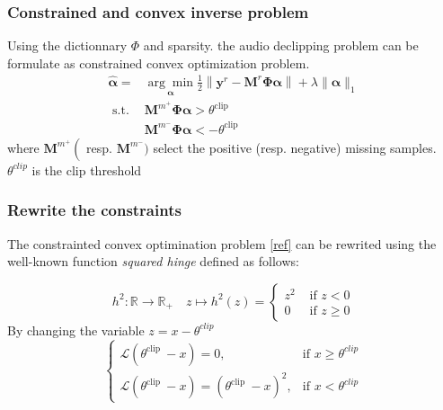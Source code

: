 \documentclass{article}
\numberwithin{dummy}{section}
\begin{document}
\subsubsection{Constrained and convex inverse problem}
Using the dictionnary $\Phi$ and sparsity.
the audio declipping problem can be formulate as constrained convex optimization problem.
\begin{equation}
\begin{aligned}
\hat{\boldsymbol{\alpha}}=& \underset{\boldsymbol{\alpha}}{\arg \min } \frac{1}{2}\left\|\mathbf{y}^{r}-\mathbf{M}^{r} \mathbf{\Phi} \boldsymbol{\alpha}\right\|+\lambda\|\boldsymbol{\alpha}\|_{1} \\
\text { s.t. } & \mathbf{M}^{m^{+}} \mathbf{\Phi} \boldsymbol{\alpha}>\theta^{\text {clip }} \\
& \mathbf{M}^{m^{-}} \mathbf{\Phi} \boldsymbol{\alpha}<-\theta^{\text {clip}}
\end{aligned}
\label{ref}
\end{equation}
where
$\mathbf{M}^{m^{+}}\left(\right.$ resp. $\left.\mathbf{M}^{m^{-}}\right.)$ select the positive (resp. negative) missing samples.\\
$\theta^{clip}$ is the clip threshold
\subsubsection{Rewrite the constraints}
The constrainted convex optimination problem \ref{ref} can be rewrited using the well-known function \textit{squared hinge} defined as follows:

$$
h^{2}: \mathbb{R} \longrightarrow \mathbb{R}_{+} \quad z \mapsto h^{2}(z)=\left\{\begin{array}{ll}
z^{2} & \text { if } z<0 \\
0 & \text { if } z \geq 0
\end{array}\right.
$$
By changing the variable $z=x-\theta^{clip}$\\
\[
\begin{cases}
\mathcal{L}\left(\theta^{\text {clip }}-x\right)=0, & \text{if $x\geq \theta^{c l i p}$} \\
\mathcal{L}\left(\theta^{\text {clip }}-x\right)=\left(\theta^{\text {clip }}-x\right)^{2}, & \text{if $x<\theta^{c l i p}$} 
\end{cases}
\]
\end{document}
